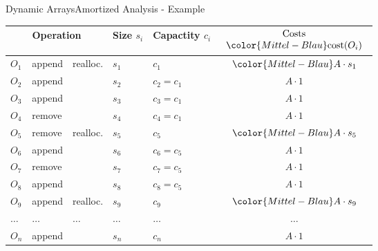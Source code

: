 
\begin{frame}{Dynamic Arrays}{Amortized Analysis - Example}
  \vspace*{-1.0em}
  \begin{table}[!h]
    \label{tab:amortized_analysis_introduction}%
    \begin{tabular}{|l|l|l|l|l|c|}
      \bottomrule
      \multicolumn{3}{|c|}{Operation} &
      Size {\color{Mittel-Blau}$s_i$} &
      Capactity {\color{Mittel-Blau}$c_i$} &
      $\begin{array}{c}
        \text{Costs}\\
        {\color{Mittel-Blau}\mathrm{cost}(O_i)}
      \end{array}$\\
      \toprule
      $O_1$ & append & {\color{Mittel-Blau}realloc.} &
      $s_1$ & {\color{Mittel-Blau}$c_1$} &
      ${\color{Mittel-Blau}A \cdot s_1}$\\
      $O_2$ & append & {} &
      $s_2$ & $c_2 = c_1$ & $A\cdot 1$\\
      $O_3$ & append & {} &
      $s_3$ & $c_3 = c_1$ & $A\cdot 1$\\
      $O_4$ & remove & {} &
      $s_4$ & $c_4 = c_1$ & $A\cdot 1$\\
      \midrule
      $O_5$ & remove & {\color{Mittel-Blau}realloc.} &
      $s_5$ & {\color{Mittel-Blau}$c_5$} &
      ${\color{Mittel-Blau}A \cdot s_5}$\\
      $O_6$ & append & {} &
      $s_6$ & $c_6 = c_5$ & $A\cdot 1$\\
      $O_7$ & remove & {} &
      $s_7$ & $c_7 = c_5$ & $A\cdot 1$\\
      $O_8$ & append & {} &
      $s_8$ & $c_8 = c_5$ & $A\cdot 1$\\
      \midrule
      $O_9$ & append & {\color{Mittel-Blau}realloc.} &
      $s_9$ & {\color{Mittel-Blau}$c_9$} &
      ${\color{Mittel-Blau}A \cdot s_9}$\\
      $\dots$ & $\dots$ & $\dots$ & $\dots$ & $\dots$ & $\dots$\\
      $O_n$ & append & {} &
      $s_n$ & $c_n$ & $A\cdot 1$\\
      \bottomrule
    \end{tabular}
  \end{table}
\end{frame}

